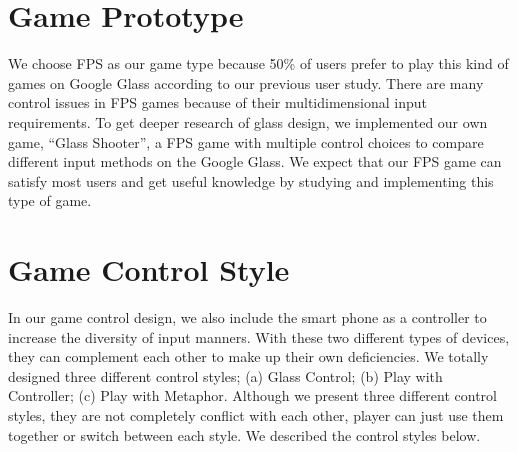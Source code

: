 \documentclass{sigchi}
\begin{document}


\section{Game Prototype}
We choose FPS as our game type because 50\% of users prefer to play this kind of games on Google Glass according to our previous user study. There are many control issues in FPS games because of their multidimensional input requirements. To get deeper research of glass design, we implemented our own game, ``Glass Shooter'', a FPS game with multiple control choices to compare different input methods on the Google Glass. We expect that our FPS game can satisfy most users and get useful knowledge by studying and implementing this type of game.

\section{Game Control Style}
In our game control design, we also include the smart phone as a controller to increase the diversity of input manners. With these two different types of devices, they can complement each other to make up their own deficiencies. We totally designed three different control styles; (a) Glass Control; (b) Play with Controller; (c) Play with Metaphor. Although we present three different control styles, they are not completely conflict with each other, player can just use them together or switch between each style. We described the control styles below.
\end{document}
